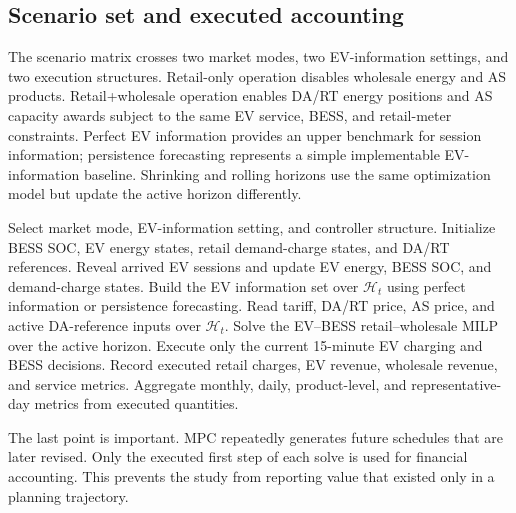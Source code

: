 \documentclass[final,5p,times]{elsarticle}
\newcommand{\calH}{\mathcal{H}}
\begin{document}
\subsection{Scenario set and executed accounting}
The scenario matrix crosses two market modes, two EV-information settings, and two execution structures. Retail-only operation disables wholesale energy and AS products. Retail+wholesale operation enables DA/RT energy positions and AS capacity awards subject to the same EV service, BESS, and retail-meter constraints. Perfect EV information provides an upper benchmark for session information; persistence forecasting represents a simple implementable EV-information baseline. Shrinking and rolling horizons use the same optimization model but update the active horizon differently.

\begin{algorithm}[!t]
\caption{Execution-aware EV--BESS simulation}
\label{alg:mpc_execution}
\begin{algorithmic}[1]
\STATE Select market mode, EV-information setting, and controller structure.
\STATE Initialize BESS SOC, EV energy states, retail demand-charge states, and DA/RT references.
    \STATE Reveal arrived EV sessions and update EV energy, BESS SOC, and demand-charge states.
    \STATE Build the EV information set over $\calH_t$ using perfect information or persistence forecasting.
    \STATE Read tariff, DA/RT price, AS price, and active DA-reference inputs over $\calH_t$.
    \STATE Solve the EV--BESS retail--wholesale MILP over the active horizon.
    \STATE Execute only the current 15-minute EV charging and BESS decisions.
    \STATE Record executed retail charges, EV revenue, wholesale revenue, and service metrics.
\ENDFOR
\STATE Aggregate monthly, daily, product-level, and representative-day metrics from executed quantities.
\end{algorithmic}
\end{algorithm}

The last point is important. MPC repeatedly generates future schedules that are later revised. Only the executed first step of each solve is used for financial accounting. This prevents the study from reporting value that existed only in a planning trajectory.
\end{document}
